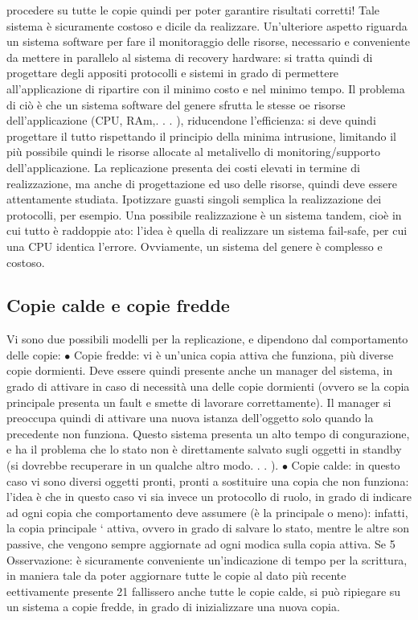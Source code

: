 procedere su tutte le copie quindi per poter garantire risultati corretti! Tale
sistema è sicuramente costoso e dicile da realizzare.
Un'ulteriore aspetto riguarda un sistema software per fare il monitoraggio
delle risorse, necessario e conveniente da mettere in parallelo al sistema di recovery hardware: si tratta quindi di
progettare degli appositi protocolli e sistemi in
grado di permettere all'applicazione di ripartire con il minimo costo e nel minimo
tempo. Il problema di ciò è che un sistema software del genere sfrutta le stesse
oe
risorse dell'applicazione (CPU, RAm,. . . ), riducendone l'efficienza: si deve quindi progettare il tutto rispettando il
principio della minima intrusione, limitando
il più possibile quindi le risorse allocate al metalivello di monitoring/supporto
dell'applicazione. La replicazione presenta dei costi elevati in termine di realizzazione, ma anche di progettazione ed
uso delle risorse, quindi deve essere
attentamente studiata. Ipotizzare guasti singoli semplica la realizzazione dei
protocolli, per esempio.
Una possibile realizzazione è un sistema tandem, cioè in cui tutto è raddoppie
ato: l'idea è quella di realizzare un sistema fail-safe, per cui una CPU identica
l'errore. Ovviamente, un sistema del genere è complesso e costoso.
\subsection{Copie calde e copie fredde}
Vi sono due possibili modelli per la replicazione, e dipendono dal comportamento
delle copie:
$\bullet$ Copie fredde: vi è un'unica copia attiva che funziona, più diverse copie
dormienti. Deve essere quindi presente anche un manager del sistema, in
grado di attivare in caso di necessità una delle copie dormienti (ovvero se
la copia principale presenta un fault e smette di lavorare correttamente).
Il manager si preoccupa quindi di attivare una nuova istanza dell'oggetto
solo quando la precedente non funziona. Questo sistema presenta un alto
tempo di congurazione, e ha il problema che lo stato non è direttamente
salvato sugli oggetti in standby (si dovrebbe recuperare in un qualche altro
modo. . . ).
$\bullet$ Copie calde: in questo caso vi sono diversi oggetti pronti, pronti a sostituire una copia che non funziona:
l'idea è che in questo caso vi sia invece
un protocollo di ruolo, in grado di indicare ad ogni copia che comportamento deve assumere (è la principale o meno):
infatti, la copia principale
` attiva, ovvero in grado di salvare lo stato, mentre le altre son passive,
che vengono sempre aggiornate ad ogni modica sulla copia attiva. Se
5 Osservazione: è sicuramente conveniente un'indicazione di tempo per la scrittura, in
maniera tale da poter aggiornare tutte le copie al dato più recente eettivamente presente
21
fallissero anche tutte le copie calde, si può ripiegare su un sistema a copie
fredde, in grado di inizializzare una nuova copia.
